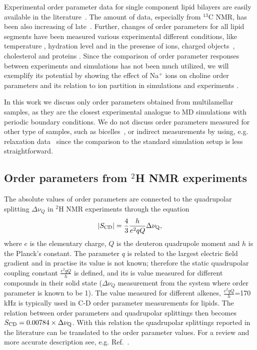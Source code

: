 \documentclass[aps,prl,superscriptaddress,twocolumn]{revtex4}
\begin{document}
Experimental order parameter data for single component lipid bilayers are easily available in the literature~\cite{castro07,castro08,leftin11,marsh13,ferreira13,leftin13,leftin14,botan15}. 
The amount of data, especially from $^{13}$C NMR, has been also increasing of late~\cite{castro07,castro08,ferreira13,leftin13,leftin14}.
Further, changes of order parameters for all lipid segments have been measured various experimental
different conditions, like temperature \cite{seelig74,gally75,seelig77,douliez95}, 
hydration level \cite{bechinger91,ulrich94,mallikarjunaiah11,dvinskikh05a} and in the presense 
of ions, charged objects~\cite{akutsu81,altenbach84,seelig87,scherer89}, 
cholesterol \cite{brown78,douliez95,ferreira13,leftin14} and proteins \cite{kuchinka89,roux90,leftin13}.
Since the comparison of order parameter responses between experiments and simulations
has not been much utilized, we will exemplify its potential by showing
the effect of Na$^+$ ions on choline order parameters and its relation to ion partition in 
simulations \cite{ionpaper} and experiments \cite{akutsu81,altenbach84,seelig87,scherer89}.

In this work we discuss only order parameters obtained from multilamellar samples, as they are  the closest experimental analogue to MD simulations with periodic boundary conditions. 
We do not discuss order parameters measured for other type of samples, such as 
bicelles~\cite{aussenac03,raffard00,sanders92}, or indirect measurements by using, e.g. relaxation
data~\cite{marbella15} since the comparison to the standard simulation setup is less straightforward.  



\subsection{Order parameters from $^2$H NMR experiments}\label{DopSECTION}

The absolute values of order parameters are connected to the quadrupolar splitting $\Delta \nu_Q$ 
in $^2$H NMR experiments through the equation 
\begin{equation}\label{HNMRop}
|S_{{\rm CD}}|=\frac{4}{3} \frac{h}{e^2qQ} \Delta \nu_{{\rm Q}}, 
\end{equation}
where $e$ is the elementary charge, $Q$ is the deuteron quadrupole moment and $h$ is the Planck's constant. 
The parameter $q$ is related to the largest electric field gradient and in practise its value is not known; 
therefore the static quadrupolar coupling constant $\frac{e^2qQ}{h}$ is defined, and its is value measured for 
different compounds in their solid state ($\Delta \nu_Q$ measurement from the system where order parameter is known to be 1). 
The value measured for different alkenes, $\frac{e^2qQ}{h}$=170 kHz is typically used in 
C-D order parameter measurements for lipids. The relation between order parameters 
and quadrupolar splittings then becomes $S_{{\rm CD}}=0.00784 \times \Delta \nu_{{\rm Q}}$.
With this relation the quadrupolar splittings reported in the literature can be translated to 
the order parameter values. For a review and more accurate description see, e.g. Ref.~\cite{seelig77c}.
\end{document}
